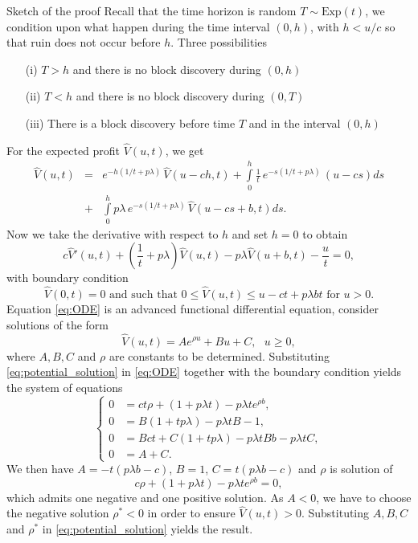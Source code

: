 \documentclass{beamer}
\begin{document}
\begin{frame}[allowframebreaks]{Sketch of the proof}
\scriptsize
Recall that the time horizon is random $T\sim\text{Exp}(t)$, we condition upon what happen during the time interval $(0,h)$, with $h<u/c$ so that ruin does not occur before $h$. Three possibilities
\begin{itemize}
  \item[(i)] $T>h$ and there is no block discovery during $(0,h)$
  \item[(ii)] $T<h$ and there is no block discovery during $(0,T)$
  \item[(iii)] There is a block discovery before time $T$ and in the interval $(0,h)$
\end{itemize}
For the expected profit $\widehat{V}(u,t)$, we get 
\begin{eqnarray*}
  \widehat{V}(u,t)& =&e^{-h(1/t + p\lambda)}\,\widehat{V}(u-ch,t)+\int\limits_0^h\frac1t\, e^{-s(1/t + p\lambda)}\,(u-cs)ds\\
  &+&\int\limits_0^h p\lambda\, e^{-s(1/t + p\lambda)}\,\widehat{V}(u-cs+b,t)ds.
  \end{eqnarray*}
Now we take the derivative with respect to $h$ and set $h=0$ to obtain
\begin{equation}\label{eq:ODE}
c\widehat{V}'(u,t) + \left(\frac{1}{t} +  p\lambda\right)\widehat{V}(u,t) - p\lambda \widehat{V}(u+b,t) - \frac{u}{t} =0,
\end{equation}
with boundary condition 
$$\widehat{V}(0,t) = 0 \text{ and such that } 0\leq \widehat{V}(u,t)\leq u-ct+p\lambda b t \text{ for }u>0.
$$  
Equation \eqref{eq:ODE} is an advanced functional differential equation, consider solutions of the form 
\begin{equation}\label{eq:potential_solution}
\widehat{V}(u,t) = Ae^{\rho u }+Bu + C,\text{ }u \ge 0, 
\end{equation}
where $A, B,C$ and $\rho$ are constants to be determined. Substituting \eqref{eq:potential_solution} in \eqref{eq:ODE} together with the boundary condition yields the system of equations 
\begin{equation*}
\begin{cases}
0&=ct\rho + \left(1+p\lambda t\right)-p\lambda te^{\rho b}, \\
0&= B\left(1+tp\lambda\right)-p\lambda tB - 1,\\
0&=Bct+C(1+tp\lambda) - p\lambda t Bb-p\lambda tC, \\
0&=A+C.
\end{cases}
\end{equation*}
We then have $A = -t(p\lambda b - c)$, $B = 1$, $C = t(p\lambda b - c)$ and $\rho$ is solution of 
$$
c\rho + \left(1+p\lambda t\right)-p\lambda te^{\rho b} = 0,
$$
which admits one negative and one positive solution. As $A<0$, we have to choose the negative solution $\rho^\ast<0$ in order to ensure $\widehat{V}(u,t)>0$. Substituting $A,B,C$ and $\rho^{\ast}$ in \eqref{eq:potential_solution}  yields the result.\\


\end{frame}
\end{document}
